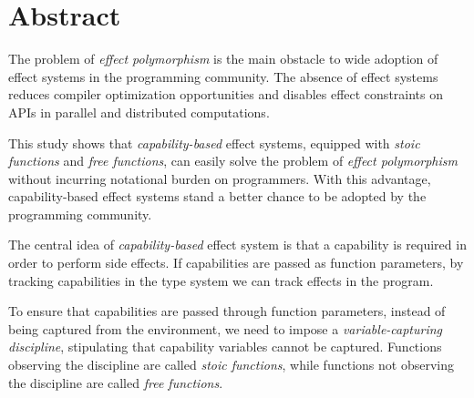 \section*{\centering Abstract}

The problem of \emph{effect polymorphism} is the main obstacle to wide
adoption of effect systems in the programming community. The absence
of effect systems reduces compiler optimization opportunities and
disables effect constraints on APIs in parallel and distributed
computations.

This study shows that \emph{capability-based} effect systems, equipped
with \emph{stoic functions} and \emph{free functions}, can easily
solve the problem of \emph{effect polymorphism} without incurring
notational burden on programmers. With this advantage,
capability-based effect systems stand a better chance to be adopted by
the programming community.

The central idea of \emph{capability-based} effect system is that a
capability is required in order to perform side effects. If
capabilities are passed as function parameters, by tracking
capabilities in the type system we can track effects in the program.

To ensure that capabilities are passed through function parameters,
instead of being captured from the environment, we need to impose a
\emph{variable-capturing discipline}, stipulating that capability
variables cannot be captured. Functions observing the discipline are
called \emph{stoic functions}, while functions not observing the
discipline are called \emph{free functions}.

